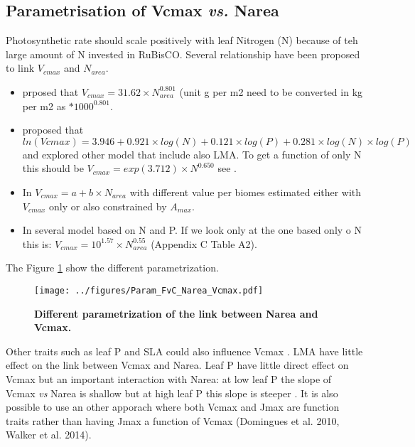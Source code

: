 \documentclass[a4paper,11pt]{article}
\begin{document}
\subsection{Parametrisation of Vcmax \textit{vs.} Narea}

Photosynthetic rate should scale positively with leaf Nitrogen (N) because of teh large amount of N invested in RuBisCO. Several relationship have been proposed to link $V_{cmax}$ and $N_{area}$.

\begin{itemize}

\item \citet{Sakschewski-2015} prposed that $V_{cmax} = 31.62 \times N_{area}^{0.801}$ (unit g per m2 need to be converted in kg per m2 as $*1000^{0.801}$.

\item  \citet{Walker-2014} proposed that $ln(Vcmax) = 3.946 + 0.921 \times log(N) + 0.121 \times log(P) + 0.281 \times log(N) \times log(P)$ and explored other model that include also LMA. To get a function of only N this should be $V_{cmax} = exp(3.712) \times N^{0.650}$ see  \citet{Walker-2017}.

\item In \citet{Kattge-2011} $V_{cmax} = a + b \times N_{area}$ with different value per biomes estimated either with $V_{cmax}$ only or also constrained by $A_{max}$.

\item In \citet{Domingues-2010} several model based on N and P.  If we look only at the one based only o N this is: $V_{cmax} = 10^{1.57} \times N_{area}^{0.55}$ (Appendix C Table A2).

\end{itemize}

The Figure \ref{fig:Narea_Vcmax} show the different parametrization.

\begin{figure}[ht]
\centering
\texttt{[image: ../figures/Param\_FvC\_Narea\_Vcmax.pdf]}
\caption{\textbf{Different parametrization of the link between Narea and Vcmax.}
\label{fig:Narea_Vcmax}}
\end{figure}

Other traits such as leaf P and SLA could also influence Vcmax \citep{Walker-2014,Domingues-2010}. LMA have little effect on the link between Vcmax and Narea.  Leaf P have little direct effect on Vcmax but an important interaction with Narea: at low leaf P the slope of Vcmax \textit{vs} Narea is shallow but at high leaf P this slope is steeper \citep{Walker-2014}.
It is also possible to use an other apporach where both Vcmax and Jmax are function traits rather than having Jmax a function of Vcmax (Domingues et al. 2010, Walker et al. 2014).
\end{document}
